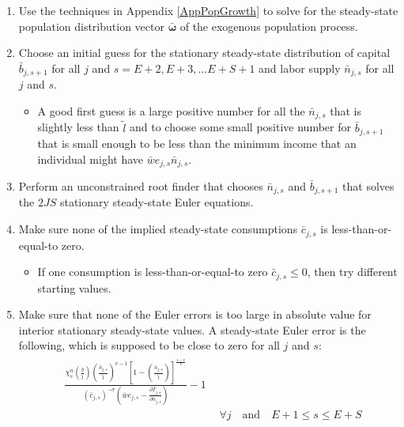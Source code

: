   \begin{enumerate}
    \item Use the techniques in Appendix \ref{AppPopGrowth} to solve for the steady-state population distribution vector $\bm{\bar{\omega}}$ of the exogenous population process.
    \item Choose an initial guess for the stationary steady-state distribution of capital $\bar{b}_{j,s+1}$ for all $j$ and $s=E+2,E+3,...E+S+1$ and labor supply $\bar{n}_{j,s}$ for all $j$ and $s$.
      \begin{itemize}
        \item A good first guess is a large positive number for all the $\bar{n}_{j,s}$ that is slightly less than $\tilde{l}$ and to choose some small positive number for $\bar{b}_{j,s+1}$ that is small enough to be less than the minimum income that an individual might have $\bar{w}e_{j,s}\bar{n}_{j,s}$.
      \end{itemize}
    \item Perform an unconstrained root finder that chooses $\bar{n}_{j,s}$ and $\bar{b}_{j,s+1}$ that solves the $2JS$ stationary steady-state Euler equations.
    \item Make sure none of the implied steady-state consumptions $\bar{c}_{j,s}$ is less-than-or-equal-to zero.
      \begin{itemize}
        \item If one consumption is less-than-or-equal-to zero $\bar{c}_{j,s}\leq 0$, then try different starting values.
      \end{itemize}
    \item Make sure that none of the Euler errors is too large in absolute value for interior stationary steady-state values. A steady-state Euler error is the following, which is supposed to be close to zero for all $j$ and $s$:
      \begin{align}
        \begin{split}
          &\frac{\chi^n_{s}\left(\frac{b}{\tilde{l}}\right)\left(\frac{\bar{n}_{j,s}}{\tilde{l}}\right)^{v-1}\left[1 - \left(\frac{\bar{n}_{j,s}}{\tilde{l}}\right)\right]^{\frac{1-v}{v}}}{(\bar{c}_{j,s})^{-\sigma}\left(\bar{w} e_{j,s} - \frac{\partial\bar{T}_{j,s}}{\partial \bar{n}_{j,s}}\right)} - 1 \\
          &\qquad\qquad\qquad\qquad\qquad\qquad\qquad\forall j\quad\text{and}\quad E+1\leq s\leq E+S
        \end{split} \label{EqSSeulerrLab} \\
        \begin{split}

\end{split}
\end{align}
\end{enumerate}
